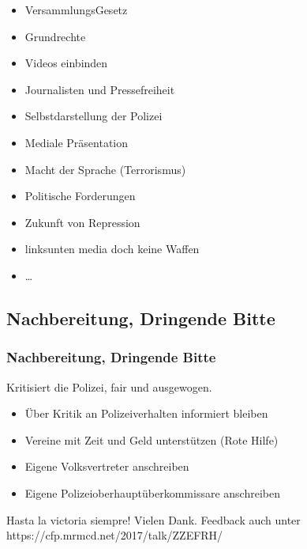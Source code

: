 \documentclass[]{beamer}
\begin{document}
\begin{frame}
	\begin{itemize}
		\item VersammlungsGesetz
		\item Grundrechte
		\item Videos einbinden
		\item Journalisten und Pressefreiheit
		\item Selbstdarstellung der Polizei
		\item Mediale Präsentation
		\item Macht der Sprache (Terrorismus)
		\item Politische Forderungen
		\item Zukunft von Repression 
		\item linksunten media doch keine Waffen {\cite{Monroy2017}}
		\item \dots
	\end{itemize}
\end{frame}

	\begin{frame}
	\subsection{Nachbereitung, Dringende Bitte}
	\frametitle{Nachbereitung, Dringende Bitte}
	Kritisiert die Polizei, fair und ausgewogen.
	\vfill
	\begin{itemize}
		\item Über Kritik an Polizeiverhalten informiert bleiben
		\item Vereine mit Zeit und Geld unterstützen (Rote Hilfe)
		\item Eigene Volksvertreter anschreiben
		\item Eigene Polizeioberhauptüberkommissare anschreiben
	\end{itemize}
	\vfill
	Hasta la victoria siempre!
	\vfill
	Vielen Dank.
	\vfill
	Feedback auch unter https://cfp.mrmcd.net/2017/talk/ZZEFRH/
\end{frame}

\begin{frame}
	
\end{frame}
\end{document}
